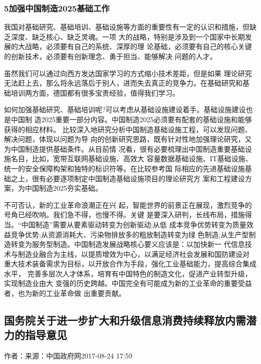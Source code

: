 \documentclass[11pt]{ctexart}
\begin{document}
{{{{\subsubsection{5加强中国制造2025基础工作}
\label{sec:org9e61017}
我国对基础研究、基础培训、基础设施等方面的重要性有一定的认识和措施，但缺乏深度、缺乏核心、缺乏灵魂。一项
大的战略，特别是涉及到一个国家中长期发展的大战略，必须要有自己的系统、深厚的理
论基础，必须要有自己的核心关键的创新技术，必须要有创新理念、勇于担当、能够解决
问题的人才。

虽然我们可以通过向西方发达国家学习的方式缩小技术差距，但是如果
理论研究无法赶上去，那么将永远落后于别人，进而失去真正的竞争力。在基础研究和基
础培训两方面，德国都有很多宝贵经验，值得我们学习。

如何加强基础研究、基础培训呢?可以考虑从基础设施建设着手。基础设施建设也是中国制
造2025重要一部分内容。中国制造2025必须要有配套的基础设施和能够获得的相应材料。
比较深入地研究分析中国制造基础设施工程，可以发现问题、解决问题，体现以问题为导
向的创新研究思路，既有针对性地加强理论研究，又为中国制造提供基础条件。从目前情
况看，很有必要梳理出中国制造重要基础设施名目，比如，宽带互联网基础设施、高效大
容量数据基础设施、IT基础设施、统一的安全保障构架和独特的标识符等。在比较参考国
际相应的先进基础设施基础之上，很有必要逐项制定中国制造基础设施项目的理论研究方
案和工程建设方案，为中国制造2025夯实基础。

不可否认，新的工业革命浪潮正在兴 起，智能世界的前景正在展现，激烈竞争的号角已经吹响。我们急不得，也慢不得。关键
是要深入研判，长线布局，措施得当。“中国制造”需要从要素驱动转变为创新驱动;从低
成本竞争优势转变为质量效益竞争优势;从资源消耗大、污染物排放多的粗放制造转变为绿
色制造;从生产型制造转变为服务型制造。中国制造发展战略核心要义应该是：以加快新一
代信息技术与制造业融合为主线，以提质增效为中心，以满足经济社会发展和国防建设对
重大技术装备需求为目标，以开放合作为手段，强化工业基础能力，提高综合集成水平，
完善多层次人才体系，培育有中国特色的制造文化，促进产业转型升级，实现制造业由大
变强的历史跨越。中国完全有可能成为新的工业革命的重要受益者，也为新的工业革命做
出重要贡献。



\subsection{国务院关于进一步扩大和升级信息消费持续释放内需潜力的指导意见}
\label{sec:orgfc7fd75}

作者：来源：中国政府网2017-08-24 17:59




}}}}
\end{document}

